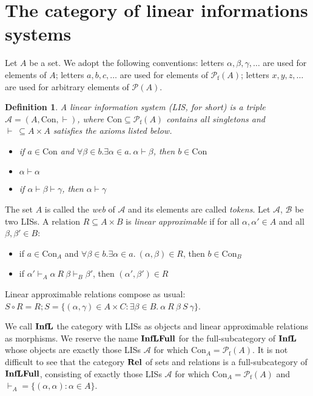 \documentclass[copyright,creativecommons]{eptcs}
\newtheorem{definition}[theorem]{Definition}
\newcommand{\cA}{\mathcal{A}}
\newcommand{\cB}{\mathcal{B}}
\newcommand{\cP}{\mathcal{P}}
\newcommand{\ga}{\alpha}
\newcommand{\gb}{\beta}
\newcommand{\gc}{\gamma}
\newcommand{\rf}{\mathrm{f}}
\newcommand{\Con}{\mathrm{Con}} \newcommand{\Com}{\mathrm{Com}} \newcommand{\Sup}{\mathrm{Sup}} %
\begin{document}
\section{The category of linear informations systems}

Let $A$ be a set. We adopt the following conventions: letters $\ga, \gb, \gc, \ldots$ are used for elements of $A$; letters $a, b, c, \ldots$ are used for elements of $\cP_\rf(A)$; letters $x, y, z, \ldots$ are used for arbitrary elements of $\cP(A)$.

\begin{definition}
A \emph{linear information system} (LIS, for short) is a triple $\cA= (A, \Con, \vdash)$, where \mbox{$\Con \subseteq \cP_\rf(A)$} contains all singletons and $\vdash \ \subseteq A \times A$ satisfies the axioms listed below.
\begin{itemize}
\item[(IS1)] if $a \in \Con$ and $\forall \gb \in b.\exists \ga \in a.\ \ga \vdash \gb$, then $b \in \Con$
\item[(IS2)] $\ga \vdash \ga$
\item[(IS3)] if $\ga \vdash \gb \vdash \gc$, then $\ga \vdash \gc$
\end{itemize}
\end{definition}

The set $A$ is called the \emph{web} of $\cA$ and its elements are called \emph{tokens}. Let $\cA$, $\cB$ be two LISs. A relation $R \subseteq A \times B$ is \emph{linear approximable} if for all $\ga,\ga' \in A$ and all $\gb,\gb' \in B$:
\begin{itemize}
\item[(AR1)] if $a \in \Con_A$ and $\forall \gb \in b.\exists \ga \in a.\ (\ga, \gb) \in R$, then $b \in \Con_B$
\item[(AR2)] if $\ga' \vdash_A \ga \ R \ \gb \vdash_B \gb'$, then $(\ga', \gb') \in R$
\end{itemize}

Linear approximable relations compose as usual: $S \circ R = R; S = \{(\ga,\gc) \in A \times C : \exists \gb \in B.\ \ga \ R \ \gb \ S \ \gc\}$.

We call $\mathbf{InfL}$ the category with LISs as objects and linear approximable relations as morphisms. We reserve the name $\mathbf{InfLFull}$ for the full-subcategory of $\mathbf{InfL}$ whose objects are exactly those LISs $\cA$ for which $\Con_A = \cP_\rf(A)$. It is not difficult to see that the category $\mathbf{Rel}$ of sets and relations is a full-subcategory of $\mathbf{InfLFull}$, consisting of exactly those LISs $\cA$ for which $\Con_A = \cP_\rf(A)$ and \mbox{$\vdash_A = \{(\ga,\ga) : \ga \in A\}$}.
\end{document}
